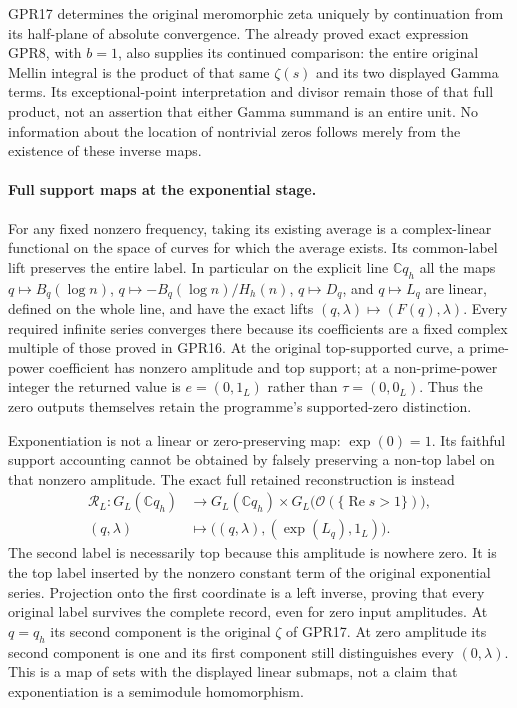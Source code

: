 GPR17 determines the original meromorphic zeta uniquely
by continuation from its half-plane of absolute
convergence. The already proved exact expression GPR8,
with $b=1$, also supplies its continued comparison:
the entire original Mellin integral is the product
of that same $\zeta(s)$ and its two displayed Gamma
terms. Its exceptional-point interpretation and
divisor remain those of that full product, not an
assertion that either Gamma summand is an entire unit.
No information about the location of nontrivial
zeros follows merely from the existence of these
inverse maps.

\paragraph{Full support maps at the exponential stage.}
For any fixed nonzero frequency, taking its existing
average is a complex-linear functional on the space
of curves for which the average exists. Its
common-label lift preserves the entire label.
In particular on the explicit line
$\mathbb C q_h$ all the maps
$q\mapsto B_q(\log n)$,
$q\mapsto-B_q(\log n)/H_h(n)$,
$q\mapsto D_q$, and $q\mapsto L_q$
are linear, defined on the whole line, and have the
exact lifts $(q,\lambda)\mapsto(F(q),\lambda)$.
Every required infinite series converges there
because its coefficients are a fixed complex
multiple of those proved in GPR16.
At the original top-supported curve, a prime-power
coefficient has nonzero amplitude and top support;
at a non-prime-power integer the returned value
is $e=(0,1_L)$ rather than $\tau=(0,0_L)$.
Thus the zero outputs themselves retain the
programme's supported-zero distinction.

Exponentiation is not a linear or zero-preserving
map: $\exp(0)=1$. Its faithful support accounting
cannot be obtained by falsely preserving a
non-top label on that nonzero amplitude.
The exact full retained reconstruction is instead
\begin{equation}\tag{GPR18}
 \begin{split}
 \mathcal R_L:G_L(\mathbb C q_h)&\longrightarrow
 G_L(\mathbb C q_h)\times
 G_L\bigl(\mathcal O(\{\operatorname{Re}s>1\})\bigr),\\
 (q,\lambda)&\longmapsto
       \bigl((q,\lambda),(\exp(L_q),1_L)\bigr).
 \end{split}
\end{equation}
The second label is necessarily top because this
amplitude is nowhere zero. It is the top label
inserted by the nonzero constant term of the
original exponential series. Projection onto
the first coordinate is a left inverse, proving
that every original label survives the complete
record, even for zero input amplitudes.
At $q=q_h$ its second component is the original
$\zeta$ of GPR17. At zero amplitude its second
component is one and its first component still
distinguishes every $(0,\lambda)$.
This is a map of sets with the displayed linear
submaps, not a claim that exponentiation is a
semimodule homomorphism.

